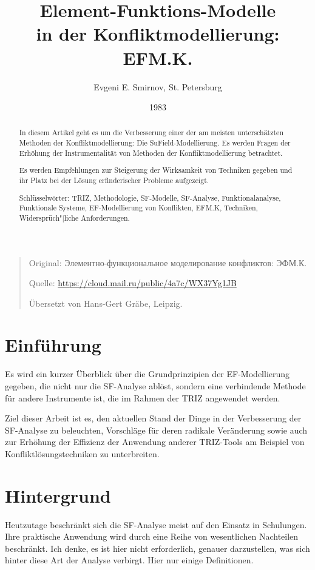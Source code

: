 \documentclass[11pt,a4paper]{article}
\title{Element-Funktions-Modelle\\ in der Konfliktmodellierung: EFM.K.}
\author{Evgeni E. Smirnov, St. Petersburg}
\date{1983}
\begin{document}
\maketitle
\begin{quote}
  Original: \foreignlanguage{russian}{Элементно-функциональное моделирование
    конфликтов: ЭФМ.К}.

  Quelle: \url{https://cloud.mail.ru/public/4a7c/WX37Yg1JB}
  
  Übersetzt von Hans-Gert Gräbe, Leipzig.
\end{quote}
\begin{abstract}
  In diesem Artikel geht es um die Verbesserung einer der am meisten
  unterschätzten Methoden der Konfliktmodellierung: Die SuField-Modellierung.
  Es werden Fragen der Erhöhung der Instrumentalität von Methoden der
  Konfliktmodellierung betrachtet.

  Es werden Empfehlungen zur Steigerung der Wirksamkeit von Techniken gegeben
  und ihr Platz bei der Lösung erfinderischer Probleme aufgezeigt.

  Schlüsselwörter: TRIZ, Methodologie, SF-Modelle, SF-Analyse,
  Funktionalanalyse, Funktionale Systeme, EF-Modellierung von Konflikten,
  EFM.K, Techniken, Widersprüch"|liche Anforderungen.
\end{abstract}

\section*{Einführung}

Es wird ein kurzer Überblick über die Grundprinzipien der EF-Modellierung
gegeben, die nicht nur die SF-Analyse ablöst, sondern eine verbindende
Methode für andere Instrumente ist, die im Rahmen der TRIZ angewendet werden. 

Ziel dieser Arbeit ist es, den aktuellen Stand der Dinge in der Verbesserung
der SF-Analyse zu beleuchten, Vorschläge für deren radikale Veränderung sowie
auch zur Erhöhung der Effizienz der Anwendung anderer TRIZ-Tools am Beispiel
von Konfliktlösungstechniken zu unterbreiten.

\section*{Hintergrund}

Heutzutage beschränkt sich die SF-Analyse meist auf den Einsatz in Schulungen.
Ihre praktische Anwendung wird durch eine Reihe von wesentlichen Nachteilen
beschränkt. Ich denke, es ist hier nicht erforderlich, genauer darzustellen,
was sich hinter diese Art der Analyse verbirgt. Hier nur einige Definitionen.
\end{document}
